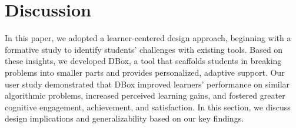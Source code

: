 
\section{Discussion}


In this paper, we adopted a learner-centered design approach, beginning with a formative study to identify students' challenges with existing tools. Based on these insights, we developed DBox, a tool that scaffolds students in breaking problems into smaller parts and provides personalized, adaptive support. Our user study demonstrated that DBox improved learners' performance on similar algorithmic problems, increased perceived learning gains, and fostered greater cognitive engagement, achievement, and satisfaction. In this section, we discuss design implications and generalizability based on our key findings.


